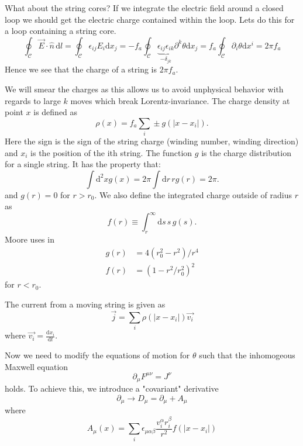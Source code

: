 \documentclass[a4paper]{article}
\begin{document}
What about the string cores?
If we integrate the electric field around a closed loop we should get the electric charge contained within the loop.
Lets do this for a loop containing a string core.
\begin{equation}
	\oint_\mathcal{C} \vec{E} \cdot \hat{n} \, \mathrm{d} l = \oint_\mathcal{C} \epsilon_{i j} E_i \mathrm{d} x_j = - f_a \oint_\mathcal{C} \underbrace{\epsilon_{i j}  \epsilon_{i k}}_{- \delta_{j k}} \partial^k \theta \mathrm{d} x_j =  f_a \oint_\mathcal{C} \partial_i \theta \mathrm{d}x^i = 2 \pi f_a
\end{equation}
Hence we see that the charge of a string is $2 \pi f_a$.

We will smear the charges as this allows us to avoid unphysical behavior with regards to large $k$ moves which break Lorentz-invariance.
The charge density at point $x$ is defined as
\begin{equation}
	\rho(x) = f_a \sum_i \pm g(|x - x_i|).
\end{equation}
Here the sign is the sign of the string charge (winding number, winding direction) and $x_i$ is the position of the ith string.
The function $g$ is the charge distribution for a single string.
It has the property that:
\begin{equation}
	\int \mathrm{d}^2 x g(x) = 2 \pi \int \mathrm{d} r \, r g(r) = 2\pi.
\end{equation}
and $g(r) = 0$ for $r > r_0$.
We also define the integrated charge outside of radius $r$ as
\begin{equation}
	f(r) \equiv \int_r^\infty \mathrm{d} s \, s \, g(s).
\end{equation}
Moore uses in \cite{Axion2D_Fleury:2016xrz}
\begin{align}
	g(r) &= 4 (r_0^2 - r^2) / r^4 \\
	f(r) &= (1 - r^2 / r_0^2)^2
\end{align}
for $r < r_0$.

The current from a moving string is given as 
\begin{equation}
	\vec{j} = \sum_i \rho(|x - x_i|) \vec{v_i}
\end{equation}
where $\vec{v_i} = \frac{\mathrm{d} x_i}{\mathrm{d} t}$.

Now we need to modify the equations of motion for $\theta$ such that the inhomogeous Maxwell equation 
\begin{equation}
	\partial_\mu F^{\mu \nu} = J^\nu
\end{equation}
holds.
To achieve this, we introduce a "covariant" derivative
\begin{equation}
	\partial_\mu \to D_\mu = \partial_\mu + A_\mu
\end{equation}
where 
\begin{equation}
	A_\mu(x) = \sum_i \epsilon_{\mu \alpha \beta} \frac{v_i^\alpha r_i^\beta}{r^2} f(|x - x_i|)
\end{equation}
\end{document}
